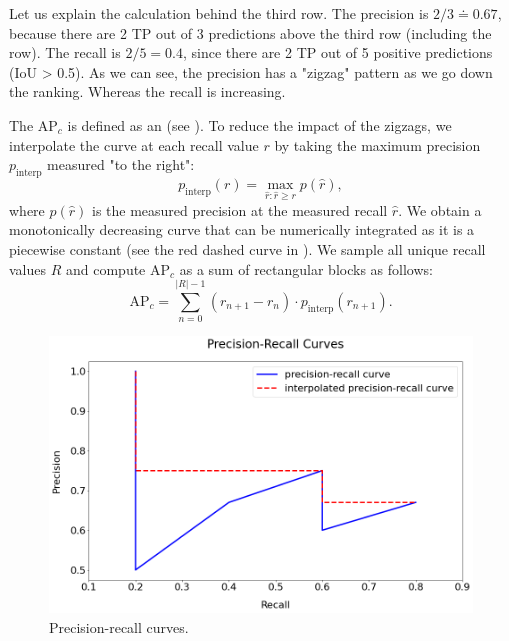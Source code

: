 Let us explain the calculation behind the third row. The precision is
$2/3 \doteq 0.67$, because there are 2 TP out of 3 predictions above the third
row (including the row). The recall is $2/5 = 0.4$, since there are 2 TP out of
5 positive predictions (IoU > 0.5). As we can see, the precision has a "zigzag"
pattern as we go down the ranking. Whereas the recall is increasing.

The AP$_c$ is defined as an  (see
). To reduce the impact of the zigzags, we
interpolate the curve at each recall value $r$ by taking the maximum precision
$p_\text{interp}$ measured "to the right":
$$
    p_\text{interp}(r) = \max\limits_{\hat{r}:\hat{r} \geq r} p(\hat{r}),
$$
where $p(\hat{r})$ is the measured precision at the measured recall $\hat{r}$.
We obtain a monotonically decreasing curve that can be numerically integrated as
it is a piecewise constant (see the red dashed curve in ). We sample all unique recall values $R$ and compute
AP$_c$ as a sum of rectangular blocks as follows:
$$
    \text{AP}_c = \sum\limits^{\lvert R\rvert - 1}_{n = 0} (r_{n+1} - r_n)
    \cdot p_\text{interp}(r_{n+1}).
$$

\begin{figure}[H]
    \centering
    \includegraphics[width=0.8\linewidth]{Sources/Figures/precisionrecall.png}
    \caption{Precision-recall curves.}
    \label{fig:precisionrecall}
\end{figure}

